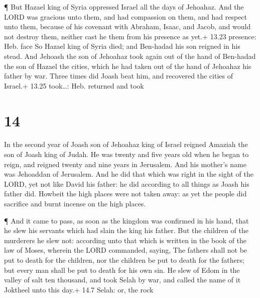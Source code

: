  ¶ But Hazael king of Syria oppressed Israel all the days
of Jehoahaz.  And the LORD was gracious unto them, and had
compassion on them, and had respect unto them, because of his covenant
with Abraham, Isaac, and Jacob, and would not destroy them, neither cast
he them from his presence as yet.+ 13.23 presence: Heb. face
 So Hazael king of Syria died; and Ben-hadad his son
reigned in his stead.  And Jehoash the son of Jehoahaz took
again out of the hand of Ben-hadad the son of Hazael the cities, which
he had taken out of the hand of Jehoahaz his father by war. Three times
did Joash beat him, and recovered the cities of Israel.+ 13.25
took\ldots: Heb. returned and took

\hypertarget{section-13}{%
\section{14}\label{section-13}}

 In the second year of Joash son of Jehoahaz king of Israel
reigned Amaziah the son of Joash king of Judah.  He was
twenty and five years old when he began to reign, and reigned twenty and
nine years in Jerusalem. And his mother's name was Jehoaddan of
Jerusalem.  And he did that which was right in the sight of
the LORD, yet not like David his father: he did according to all things
as Joash his father did.  Howbeit the high places were not
taken away: as yet the people did sacrifice and burnt incense on the
high places.

 ¶ And it came to pass, as soon as the kingdom was confirmed
in his hand, that he slew his servants which had slain the king his
father.  But the children of the murderers he slew not:
according unto that which is written in the book of the law of Moses,
wherein the LORD commanded, saying, The fathers shall not be put to
death for the children, nor the children be put to death for the
fathers; but every man shall be put to death for his own sin.
 He slew of Edom in the valley of salt ten thousand, and
took Selah by war, and called the name of it Joktheel unto this day.+
14.7 Selah: or, the rock

